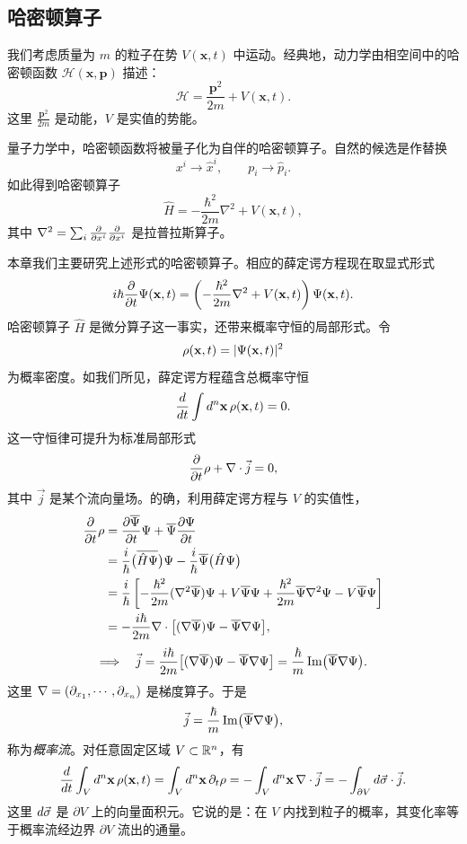 \subsection{哈密顿算子}

我们考虑质量为 $m$ 的粒子在势 $V(\mathbf x,t)$ 中运动。经典地，动力学由相空间中的哈密顿函数 $\mathcal H(\mathbf x,\mathbf p)$ 描述：
\[
\mathcal H=\frac{\mathbf p^2}{2m}+V(\mathbf x,t).
\]
这里 $\frac{\mathbf p^2}{2m}$ 是动能，$V$ 是实值的势能。

量子力学中，哈密顿函数将被量子化为自伴的哈密顿算子。自然的候选是作替换
\[
x^i\to\hat x^i,\qquad p_i\to\hat p_i.
\]
如此得到哈密顿算子
\[
\hat H=-\frac{\hbar^2}{2m}\nabla^2+V(\mathbf x,t),
\]
其中 $\nabla^2=\sum_i\frac{\partial}{\partial x^i}\frac{\partial}{\partial x^i}$ 是拉普拉斯算子。

本章我们主要研究上述形式的哈密顿算子。相应的薛定谔方程现在取显式形式
\[
i\hbar\frac{\partial}{\partial t}\Psi(\mathbf x,t)
=\left(-\frac{\hbar^2}{2m}\nabla^2+V(\mathbf x,t)\right)\Psi(\mathbf x,t).
\]
哈密顿算子 $\hat H$ 是微分算子这一事实，还带来概率守恒的局部形式。令
\[
\rho(\mathbf x,t)=\lvert \Psi(\mathbf x,t)\rvert^2
\]
为概率密度。如我们所见，薛定谔方程蕴含总概率守恒
\[
\frac{d}{d t}\int d^n\mathbf x\,\rho(\mathbf x,t)=0.
\]
这一守恒律可提升为标准局部形式
\[
\frac{\partial}{\partial t}\rho+\nabla\cdot\vec j=0,
\]
其中 $\vec j$ 是某个流向量场。的确，利用薛定谔方程与 $V$ 的实值性，
\[
\begin{aligned}
\frac{\partial}{\partial t}\rho
&=\frac{\partial\overline{\Psi}}{\partial t}\Psi+\overline{\Psi}\frac{\partial\Psi}{\partial t}\\
&=\frac{i}{\hbar}\bigl(\overline{\hat H\Psi}\bigr)\Psi-\frac{i}{\hbar}\overline{\Psi}\bigl(\hat H\Psi\bigr)\\
&=\frac{i}{\hbar}\left[-\frac{\hbar^2}{2m}(\nabla^2\overline{\Psi})\Psi
+V\overline{\Psi}\Psi+\frac{\hbar^2}{2m}\overline{\Psi}\nabla^2\Psi-V\overline{\Psi}\Psi\right]\\
&=-\frac{i\hbar}{2m}\nabla\cdot\bigl[(\nabla\overline{\Psi})\Psi-\overline{\Psi}\nabla\Psi\bigr],
\end{aligned}
\]
\[
\Longrightarrow\quad
\vec j=\frac{i\hbar}{2m}\bigl[(\nabla\overline{\Psi})\Psi-\overline{\Psi}\nabla\Psi\bigr]
=\frac{\hbar}{m}\operatorname{Im}\bigl(\overline{\Psi}\nabla\Psi\bigr).
\]
这里 $\nabla=(\partial_{x_1},\cdots,\partial_{x_n})$ 是梯度算子。于是
\[
\vec j=\frac{\hbar}{m}\operatorname{Im}\bigl(\overline{\Psi}\nabla\Psi\bigr),
\]
称为\emph{概率流}。对任意固定区域 $V\subset\mathbb{R}^n$，有
\[
\frac{d}{d t}\int_Vd^n\mathbf x\,\rho(\mathbf x,t)
=\int_Vd^n\mathbf x\,\partial_t\rho
=-\int_Vd^n\mathbf x\,\nabla\cdot\vec j
=-\int_{\partial V}d\vec\sigma\cdot\vec j.
\]
这里 $d\vec\sigma$ 是 $\partial V$ 上的向量面积元。它说的是：在 $V$ 内找到粒子的概率，其变化率等于概率流经边界 $\partial V$ 流出的通量。

